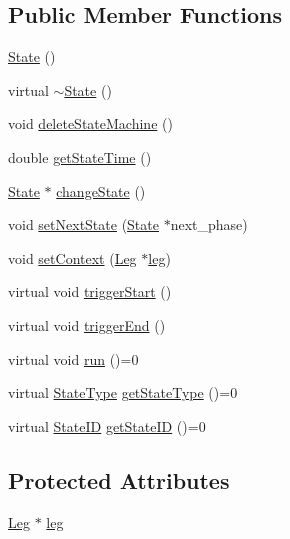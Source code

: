 \subsection*{Public Member Functions}
\begin{DoxyCompactItemize}
\item 
\hyperlink{classState_ab91bb1dd5aa6260ab2a456581daf9ec2}{State} ()
\item 
virtual \hyperlink{classState_afab438d92b90dc18d194dbd9c9c8bab3}{$\sim$\+State} ()
\item 
void \hyperlink{classState_a2c5a25eff8bd3d3456ad39fb0ad3689b}{delete\+State\+Machine} ()
\item 
double \hyperlink{classState_adf6ef04a29b91f231b6d49ed20bf109f}{get\+State\+Time} ()
\item 
\hyperlink{classState}{State} $\ast$ \hyperlink{classState_a71b4a661c220bbf591b8515f89ce5684}{change\+State} ()
\item 
void \hyperlink{classState_a99860deed7b8a7645a24e3c8ee093edc}{set\+Next\+State} (\hyperlink{classState}{State} $\ast$next\+\_\+phase)
\item 
void \hyperlink{classState_aacdb7964e195069bd096794ceb1ae699}{set\+Context} (\hyperlink{classLeg}{Leg} $\ast$\hyperlink{classState_a94c30bb5983561e80a296934c0330144}{leg})
\item 
virtual void \hyperlink{classState_a0f58488dbd4415000c7032d3f9d7d579}{trigger\+Start} ()
\item 
virtual void \hyperlink{classState_ab87ac976927bb7a765eb82a5ecdee213}{trigger\+End} ()
\item 
virtual void \hyperlink{classState_a52100b1159fda58336244ece3c45c3cc}{run} ()=0
\item 
virtual \hyperlink{States_8hpp_a1615968a92950438f6e67a28e9d56e5c}{State\+Type} \hyperlink{classState_a7692c115596084c700ce572a571b4332}{get\+State\+Type} ()=0
\item 
virtual \hyperlink{States_8hpp_a26aafbeccd8f356b39e1809f1ab9cfdc}{State\+ID} \hyperlink{classState_a4117717d54853b6fd7f06ea8c2063efe}{get\+State\+ID} ()=0
\end{DoxyCompactItemize}
\subsection*{Protected Attributes}
\begin{DoxyCompactItemize}
\item 
\hyperlink{classLeg}{Leg} $\ast$ \hyperlink{classState_a94c30bb5983561e80a296934c0330144}{leg}
\end{DoxyCompactItemize}


